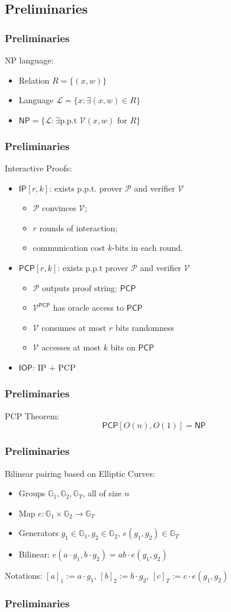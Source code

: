 \documentclass{beamer}
\begin{document}
\subsection{Preliminaries}
\frame
{
  \frametitle{Preliminaries}
  NP language:
  \begin{itemize}
  \item Relation $R=\{(x,w)\}$
  \item Language $\mathcal{L}=\{x:\exists (x,w)\in R\}$
  \item $\mathsf{NP}=\{\mathcal{L}:\exists \text{p.p.t } \mathcal{V}(x,w)\text{ for $R$}\}$
  \end{itemize}
}
\frame
{
  \frametitle{Preliminaries}
  Interactive Proofs:
  \begin{itemize}
  \item $\mathsf{IP}[r,k]$: exists p.p.t. prover $\mathcal{P}$ and verifier $\mathcal{V}$
  	\begin{itemize}
  	\item $\mathcal{P}$ convinces $\mathcal{V}$;
  	\item $r$ rounds of interaction;
  	\item communication cost $k$-bits in each round.
  	\end{itemize}
  \item $\mathsf{PCP}[r,k]$: exists p.p.t prover $\mathcal{P}$ and verifier $\mathcal{V}$
  	\begin{itemize}
  	\item $\mathcal{P}$ outputs proof string: $\mathsf{PCP}$
  	\item $\mathcal{V}^{\mathsf{PCP}}$ has oracle access to $\mathsf{PCP}$
  	\item $\mathcal{V}$ consumes at most $r$ bits randomness
  	\item $\mathcal{V}$ accesses at most $k$ bits on $\mathsf{PCP}$
	  \end{itemize}
  \item $\mathsf{IOP}$: IP + PCP
  \end{itemize}
}
\frame
{
  \frametitle{Preliminaries}
  PCP Theorem:
  \[
  	\mathsf{PCP}[O(n),O(1)]=\mathsf{NP}
  \]
}
\frame
{
  \frametitle{Preliminaries}
  Bilinear pairing based on Elliptic Curves:
  \begin{itemize}
  \item Groups $\mathbb{G}_1,\mathbb{G}_2,\mathbb{G}_T$, all of size $n$
  \item Map $e:\mathbb{G}_1\times\mathbb{G}_2\to\mathbb{G}_T$
  \item Generators $g_1\in\mathbb{G}_1,g_2\in\mathbb{G}_2$, $e(g_1,g_2)\in\mathbb{G}_T$
  \item Bilinear: $e(a\cdot g_1,b\cdot g_2)=ab\cdot e(g_1,g_2)$
  \end{itemize}
  Notations: $[a]_1:=a\cdot g_1$, $[b]_2:=b\cdot g_2$, $[c]_T:=c\cdot e(g_1,g_2)$
}
\frame
{
  \frametitle{Preliminaries}
}
\end{document}

